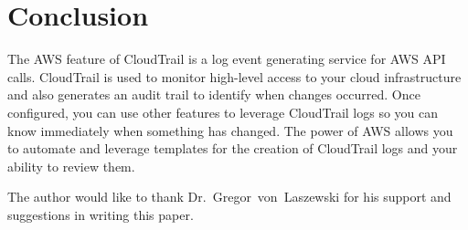 \section{Conclusion}

The AWS feature of CloudTrail is a log event generating service for AWS API 
calls. CloudTrail is used to monitor high-level access to your cloud 
infrastructure and also generates an audit trail to identify when changes 
occurred. Once configured, you can use other features to leverage CloudTrail 
logs so you can know immediately when something has changed. The power of AWS 
 allows you to automate and leverage templates for the creation of CloudTrail
 logs and your ability to review them.

\begin{acks}

The author would like to thank Dr.~Gregor~von~Laszewski for his support and 
suggestions in writing this paper.

\end{acks}


 


